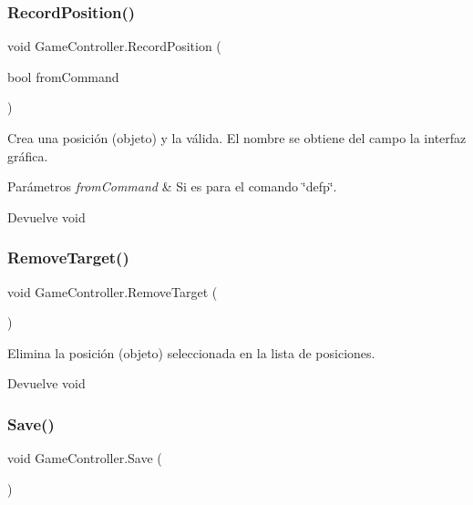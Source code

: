 \subsubsection{\texorpdfstring{RecordPosition()}{RecordPosition()}}
{\footnotesize\ttfamily void Game\+Controller.\+Record\+Position (\begin{DoxyParamCaption}\item[{bool}]{from\+Command }\end{DoxyParamCaption})\hspace{0.3cm}{\ttfamily [inline]}}

Crea una posición (objeto) y la válida. El nombre se obtiene del campo la interfaz gráfica. 
\begin{DoxyParams}{Parámetros}
{\em from\+Command} & Si es para el comando \char`\"{}defp\char`\"{}. \\
\hline
\end{DoxyParams}
\begin{DoxyReturn}{Devuelve}
void 
\end{DoxyReturn}
\mbox{\label{class_game_controller_ad8f76a41d0163fd06971dffce1d61c97}} 
\subsubsection{\texorpdfstring{RemoveTarget()}{RemoveTarget()}}
{\footnotesize\ttfamily void Game\+Controller.\+Remove\+Target (\begin{DoxyParamCaption}{ }\end{DoxyParamCaption})\hspace{0.3cm}{\ttfamily [inline]}}

Elimina la posición (objeto) seleccionada en la lista de posiciones. \begin{DoxyReturn}{Devuelve}
void 
\end{DoxyReturn}
\mbox{\label{class_game_controller_a59400b0ec3bf7841017faafba0a35f81}} 
\subsubsection{\texorpdfstring{Save()}{Save()}}
{\footnotesize\ttfamily void Game\+Controller.\+Save (\begin{DoxyParamCaption}{ }\end{DoxyParamCaption})\hspace{0.3cm}{\ttfamily [inline]}}

